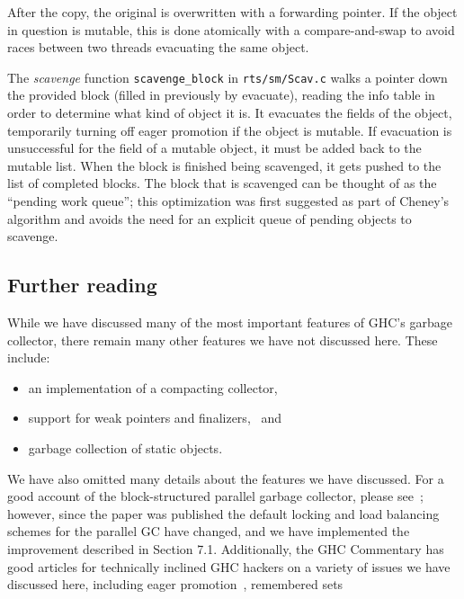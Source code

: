 After the copy, the original is overwritten with a forwarding pointer.
If the object in question is mutable, this is done atomically with a
compare-and-swap to avoid races between two threads evacuating the same
object.

The \emph{scavenge} function \verb|scavenge_block| in
\verb|rts/sm/Scav.c| walks a pointer down the provided block (filled in
previously by evacuate), reading the info table in order to determine
what kind of object it is.  It evacuates the fields of the object,
temporarily turning off eager promotion if the object is mutable.  If
evacuation is unsuccessful for the field of a mutable object, it must be
added back to the mutable list.  When the block is finished being
scavenged, it gets pushed to the list of completed blocks.  The block
that is scavenged can be thought of as the ``pending work queue''; this
optimization was first suggested as part of Cheney's algorithm and
avoids the need for an explicit queue of pending objects to scavenge.

\subsection{Further reading}

While we have discussed many of the most important features of GHC's
garbage collector, there remain many other features we have not
discussed here.  These include:

\begin{itemize}
    \item an implementation of a compacting collector,~\XXX{}
    \item support for weak pointers and finalizers,~\XXX{}  and
    \item garbage collection of static objects.~\XXX{}
\end{itemize}

We have also omitted many details about the features we have discussed.
For a good account of the block-structured parallel garbage collector,
please see~\cite{Marlow:2008:PGG:1375634.1375637}; however, since the
paper was published the default locking and load balancing schemes for
the parallel GC have changed, and we have implemented the improvement
described in Section 7.1.  Additionally, the GHC Commentary has good
articles for technically inclined GHC hackers on a variety of issues we
have discussed here, including eager promotion~\XXX{}, remembered
sets~\XXX{} 
